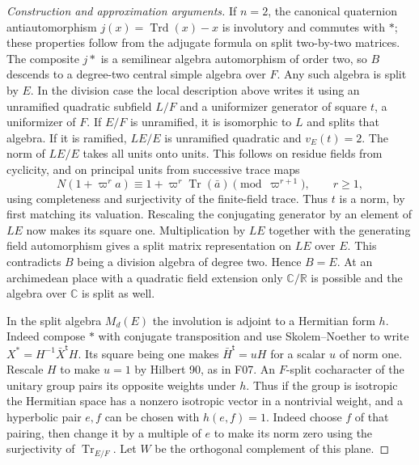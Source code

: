 \documentclass[11pt,a4paper,openany,oneside]{book}
\theoremstyle{resultstyle}
\theoremstyle{definition}
\numberwithin{equation}{chapter}
\begin{document}
\begin{proof}[Construction and approximation arguments]
If \(n=2\), the canonical quaternion antiautomorphism
\(j(x)=\operatorname{Trd}(x)-x\) is involutory and commutes
with \(\ast\); these properties follow from the adjugate
formula on split two-by-two matrices. The composite
\(j\ast\) is a semilinear algebra automorphism of order two,
so \(B\) descends to a degree-two central simple algebra
over \(F\). Any such algebra is split by \(E\).
In the division case the local description above writes it
using an unramified quadratic subfield \(L/F\) and a
uniformizer generator of square \(t\), a uniformizer of
\(F\). If \(E/F\) is unramified, it is isomorphic to \(L\)
and splits that algebra. If it is ramified, \(LE/E\) is
unramified quadratic and \(v_E(t)=2\).
The norm of \(LE/E\) takes all units onto units. This follows
on residue fields from cyclicity, and on principal units
from successive trace maps
\[
  N(1+\varpi^r a)\equiv
     1+\varpi^r\operatorname{Tr}(\bar a)\pmod{\varpi^{r+1}},
  \qquad r\geq1,
\]
using completeness and surjectivity of the finite-field
trace. Thus \(t\) is a norm, by first matching its valuation.
Rescaling the conjugating generator by an element of \(LE\)
now makes its square one. Multiplication by \(LE\) together
with the generating field automorphism gives a split matrix
representation on \(LE\) over \(E\). This contradicts \(B\)
being a division algebra of degree two. Hence \(B=E\).
At an archimedean place with a quadratic field extension
only \(\mathbb C/\mathbb R\) is possible and the algebra
over \(\mathbb C\) is split as well.

In the split algebra \(M_d(E)\) the involution is adjoint to
a Hermitian form \(h\). Indeed compose \(\ast\) with conjugate
transposition and use Skolem--Noether to write
\(X^\ast=H^{-1}\bar X^{\mathsf t}H\). Its square being one
makes \(\bar H^{\mathsf t}=uH\) for a scalar \(u\) of norm
one. Rescale \(H\) to make \(u=1\) by Hilbert 90, as in F07.
An \(F\)-split cocharacter of the unitary group pairs its
opposite weights under \(h\). Thus if the group is isotropic
the Hermitian space has a nonzero isotropic vector in a
nontrivial weight, and a hyperbolic pair \(e,f\) can be
chosen with \(h(e,f)=1\). Indeed choose \(f\) of that pairing,
then change it by a multiple of \(e\) to make its norm zero
using the surjectivity of \(\operatorname{Tr}_{E/F}\).
Let \(W\) be the orthogonal complement of this plane.


\end{proof}
\end{document}

